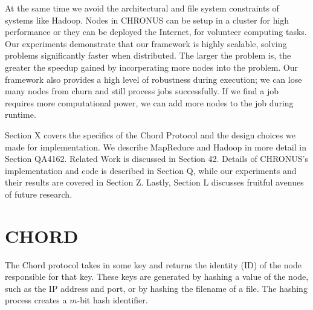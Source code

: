 \documentclass[conference, compsocconf, letterpaper]{IEEEtran}
\begin{document}
At the same time we avoid the architectural and file system constraints of systems like Hadoop.  Nodes in CHRONUS can be setup in a cluster for high performance or they can be deployed the Internet, for volunteer computing tasks.  Our experiments demonstrate that our framework is highly scalable, solving problems significantly faster when distributed.  The larger the problem is, the greater the speedup gained by incorperating more nodes into the problem.  Our framework also provides a high level of robustness during execution;  we can lose many nodes from churn and still process jobs successfully.  If we find a job requires more computational power, we can add more nodes to the job  during runtime.


Section X covers the specifics of the Chord Protocol and the design choices we made for implementation. We describe MapReduce and Hadoop in more detail in Section QA4162.  Related Work is discussed in Section 42. Details of CHRONUS's implementation and code is described in Section Q, while our experiments and their results are covered in Section Z.  Lastly, Section L discusses fruitful avenues of future research.







\section{CHORD}
The Chord protocol \cite{Chord} takes in some key and returns the identity (ID) of the node responsible for that key.  These keys are generated by hashing a value of the node, such as the IP address and port, or by hashing the filename of a file.  The hashing process creates a $m$-bit hash identifier.
\end{document}
